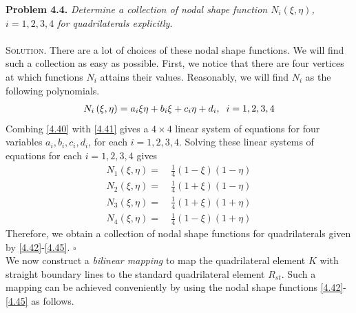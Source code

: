 \documentclass[a4paper]{article}
\numberwithin{equation}{section}
\begin{document}
\textbf{Problem 4.4.} \textit{Determine a collection of nodal shape function $N_i\left(\xi,\eta\right)$, $i=1,2,3,4$ for quadrilaterals explicitly.}\\
\\
\textsc{Solution.} There are a lot of choices of these nodal shape functions. We will find such a collection as easy as possible. First, we notice that there are four vertices at which functions $N_i$ attains their values. Reasonably, we will find $N_i$ as the following polynomials.
\begin{align}
\label{4.41}
{N_i}\left( {\xi ,\eta } \right) = {a_i}\xi \eta  + {b_i}\xi  + {c_i}\eta  + {d_i},\hspace{0.2cm} i = 1,2,3,4
\end{align}
Combing \eqref{4.40} with \eqref{4.41} gives a $4\times 4$ linear system of equations for four variables $a_i,b_i,c_i,d_i$, for each $i=1,2,3,4$. Solving these linear systems of equations for each $i=1,2,3,4$ gives
\begin{align}
\label{4.42}
{N_1}\left( {\xi ,\eta } \right) =&\ \frac{1}{4}\left( {1 - \xi } \right)\left( {1 - \eta } \right)\\
{N_2}\left( {\xi ,\eta } \right) =&\ \frac{1}{4}\left( {1 + \xi } \right)\left( {1 - \eta } \right)\\
{N_3}\left( {\xi ,\eta } \right) =&\ \frac{1}{4}\left( {1 + \xi } \right)\left( {1 + \eta } \right)\\
{N_4}\left( {\xi ,\eta } \right) =&\ \frac{1}{4}\left( {1 - \xi } \right)\left( {1 + \eta } \right) \label{4.45}
\end{align}
Therefore, we obtain a collection of nodal shape functions for quadrilaterals given by \eqref{4.42}-\eqref{4.45}. \hfill $\square$\\

We now construct a \textit{bilinear mapping} to map the quadrilateral element $K$ with straight boundary lines to the standard quadrilateral element $R_{st}$. Such a mapping can be achieved conveniently by using the nodal shape functions \eqref{4.42}-\eqref{4.45} as follows.
\end{document}
